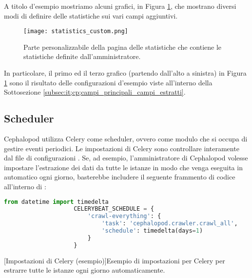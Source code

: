         	A titolo d'esempio mostriamo alcuni grafici, in Figura \ref{fig:statistics_custom}, che mostrano diversi modi di definire delle statistiche sui vari campi aggiuntivi.
        	
        	\begin{figure}[h!]
        		\begin{center}
        			\texttt{[image: statistics\_custom.png]}
        		\end{center}
        		\caption[Statistiche definite dall'amministratore]{Parte personalizzabile della pagina delle statistiche che contiene le statistiche definite dall'amministratore.}
        		\label{fig:statistics_custom}
        	\end{figure}
        	
        	In particolare, il primo ed il terzo grafico (partendo dall'alto a sinistra) in Figura \ref{fig:statistics_custom} sono il risultato delle configurazioni d'esempio viste all'interno della Sottosezione \ref{subsec:it;cp;campi_principali_campi_estratti}.
        
        \subsection{Scheduler} \label{subsec:it;cp;scheduler}
        
            Cephalopod utilizza Celery come scheduler, ovvero come modulo che si occupa di gestire eventi periodici. Le impostazioni di Celery sono controllare interamente dal file di configurazioni . Se, ad esempio, l'amministratore di Cephalopod volesse impostare l'estrazione dei dati da tutte le istanze in modo che venga eseguita in automatico ogni giorno, basterebbe includere il seguente frammento di codice all'interno di :
            
            \begin{center}
                \begin{lstlisting}[language=python, gobble=18]
                    from datetime import timedelta
                    CELERYBEAT_SCHEDULE = {
                        'crawl-everything': {
                            'task': 'cephalopod.crawler.crawl_all',
                            'schedule': timedelta(days=1)
                        }
                    }
                \end{lstlisting}
                \captionsetup{textformat=empty,labelformat=empty} \vspace{-2em}
                [Impostazioni di Celery (esempio)]{Esempio di impostazioni per Celery per estrarre tutte le istanze ogni giorno automaticamente.}
            \end{center}
            
